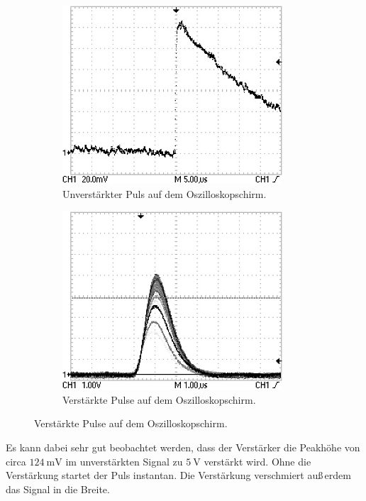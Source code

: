 \begin{figure}
    \centering
    \caption{Pulse auf dem Oszilloskopschirm.}
    \begin{subfigure}{0.49\textwidth}
        \centering
        \includegraphics[width=0.9\textwidth]{images/unverstaerkt.JPG}
        \caption{Unverstärkter Puls auf dem Oszilloskopschirm.}
        \label{fig:unverstaerkt}
    \end{subfigure}
    \begin{subfigure}{0.49\textwidth}
        \centering
        \includegraphics[width=0.9\textwidth]{images/verstaerkt.JPG}
        \caption{Verstärkte Pulse auf dem Oszilloskopschirm.}
        \label{fig:verstaerkt}
    \end{subfigure}
\end{figure}

Es kann dabei sehr gut beobachtet werden, dass der Verstärker die Peakhöhe
von circa $\SI{124}{\milli\volt}$ im unverstärkten Signal zu
$\SI{5}{\volt}$ verstärkt wird.
Ohne die Verstärkung startet der Puls instantan. Die Verstärkung
verschmiert auß\,erdem das Signal in die Breite.
